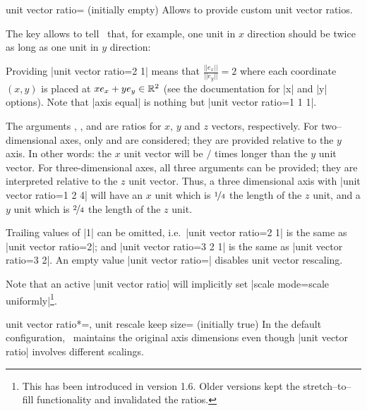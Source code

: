\begin{pgfplotskey}{unit vector ratio= (initially empty)}
	Allows to provide custom unit vector ratios. 

	The key allows to tell \PGFPlots\ that, for example, one unit in $x$ direction should be twice as long as one unit in $y$ direction:
\begin{codeexample}[]
\end{codeexample}
	\noindent Providing |unit vector ratio=2 1| means that $\frac{||e_x||}{||e_y||} = 2$ where each coordinate $(x,y)$ is placed at $x e_x + y e_y \in \mathbb{R}^2$ (see the documentation for |x| and |y| options). Note that |axis equal| is nothing but |unit vector ratio=1 1 1|.

	The arguments , , and  are ratios for $x$, $y$ and $z$ vectors, respectively. For two--dimensional axes, only  and  are considered; they are provided relative to the $y$ axis. In other words: the $x$ unit vector will be  $/$  times longer than the $y$ unit vector. For three-dimensional axes, all three arguments can be provided; they are interpreted relative to the $z$ unit vector. Thus, a three dimensional axis with |unit vector ratio=1 2 4| will have an $x$ unit which is $\nicefrac 14$ the length of the $z$ unit, and a $y$ unit which is $\nicefrac24$ the length of the $z$ unit. 
	
	Trailing values of |1| can be omitted, i.e.\ |unit vector ratio=2 1| is the same as |unit vector ratio=2|; and |unit vector ratio=3 2 1| is the same as |unit vector ratio=3 2|.
	An empty value |unit vector ratio={}| disables unit vector rescaling.

	Note that an active |unit vector ratio| will implicitly set |scale mode=scale uniformly|\footnote{This has been introduced in version 1.6. Older versions kept the stretch--to--fill functionality and invalidated the ratios.}.

	\begin{pgfplotskeylist}{%
		unit vector ratio*=,
		unit rescale keep size= (initially true)}
	In the default configuration, \PGFPlots\ maintains the original axis dimensions even though |unit vector ratio| involves different scalings. 


\end{pgfplotskeylist}
\end{pgfplotskey}
